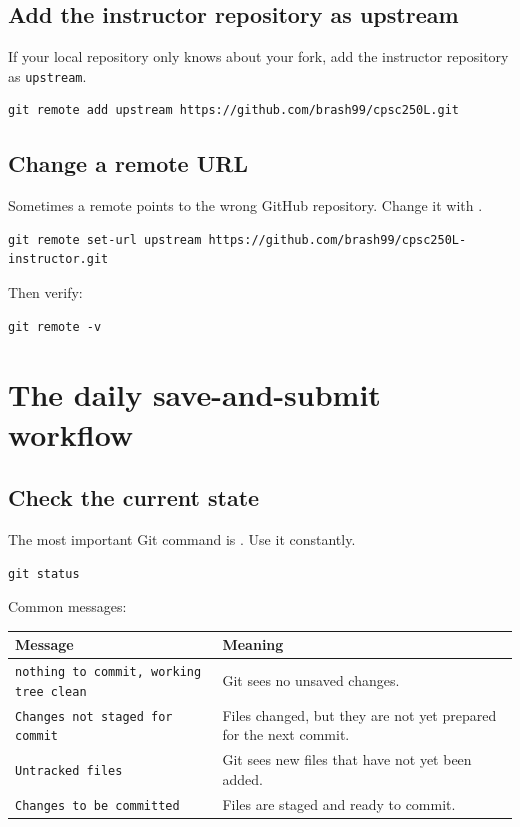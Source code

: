 \documentclass[11pt]{article}
\newcommand{\term}[1]{\textbf{\color{cnuBlue}#1}}
\newcommand{\upstream}{\texttt{upstream}}
\begin{document}
\subsection{Add the instructor repository as upstream}
If your local repository only knows about your fork, add the instructor repository as \upstream.

\begin{lstlisting}[style=terminal]
git remote add upstream https://github.com/brash99/cpsc250L.git
\end{lstlisting}

\subsection{Change a remote URL}
Sometimes a remote points to the wrong GitHub repository.  Change it with .

\begin{lstlisting}[style=terminal]
git remote set-url upstream https://github.com/brash99/cpsc250L-instructor.git
\end{lstlisting}

Then verify:

\begin{lstlisting}[style=terminal]
git remote -v
\end{lstlisting}

\section{The daily save-and-submit workflow}

\subsection{Check the current state}
The most important Git command is .  Use it constantly.

\begin{lstlisting}[style=terminal]
git status
\end{lstlisting}

Common messages:

\begin{center}
\begin{tabularx}{0.95\textwidth}{@{}lX@{}}
\toprule
\term{Message} & \term{Meaning} \\
\midrule
\texttt{nothing to commit, working tree clean} & Git sees no unsaved changes. \\
\texttt{Changes not staged for commit} & Files changed, but they are not yet prepared for the next commit. \\
\texttt{Untracked files} & Git sees new files that have not yet been added. \\
\texttt{Changes to be committed} & Files are staged and ready to commit. \\
\bottomrule
\end{tabularx}
\end{center}
\end{document}
